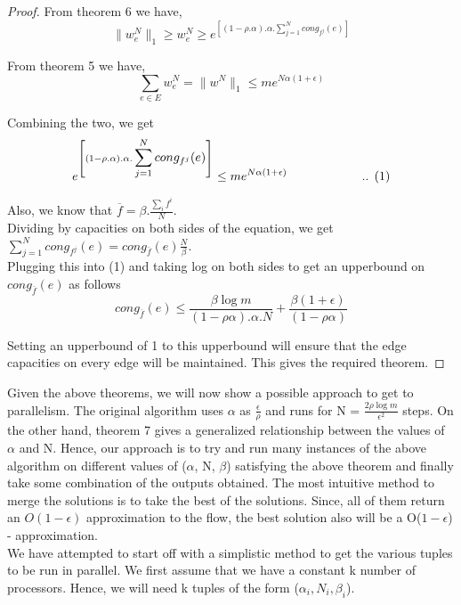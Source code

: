 \documentclass[BTech]{iitmdiss}
\begin{document}
	    \begin{proof}
	      From theorem 6 we have,
	      $$\|w_e^N\|_1 \geq w_e^N \geq e^{\left[ (1-\rho.\alpha). \alpha. \displaystyle\sum_{j=1}^N cong_{f^j}(e) \right]}$$
	      
	      From theorem 5 we have, 
	      $$\displaystyle\sum_{e \in E} w^N_e = \|w^N\|_1 \leq m e^{N\alpha(1+\epsilon)}$$
	      
	      Combining the two, we get 
	      $$e^{\left[ (1-\rho.\alpha). \alpha. \displaystyle\sum_{j=1}^N cong_{f^j}(e) \right]} \leq m e^{N\alpha(1+\epsilon)} \text{\hspace{20mm} .. (1)}$$
	      
	      Also, we know that $\overline{f} = \beta. \frac{\displaystyle\sum_{i}f^i }{N}$.\\
	      Dividing by capacities on both sides of the equation,
	      we get $\displaystyle\sum_{j=1}^N cong_{f^j}(e) = cong_{\overline{f}}(e) \frac{N}{\beta}$. \\
	      
	      Plugging this into (1) and taking log on both sides to get an upperbound on $cong_{\overline{f}}(e)$ as follows
	      $$cong_{\overline{f}}(e) \leq \frac{\beta \log m}{(1-\rho \alpha).\alpha.N} + \frac{\beta (1 + \epsilon)}{(1- \rho \alpha)}$$
	      
	      Setting an upperbound of 1 to this 
	      upperbound will ensure that the edge capacities on every edge will be maintained. This gives the required theorem.
	    \end{proof}
	    
	    Given the above theorems, we will now show a possible approach to get to parallelism. The original algorithm uses $\alpha$ as $\frac{\epsilon}{\rho}$
	    and runs for N = $\frac{2 \rho \log m}{\epsilon^2}$ steps. On the other hand, theorem 7 gives a generalized relationship between the values of 
	    $\alpha$ and N. Hence, our approach is to try and run many instances of the above algorithm on different values of ($\alpha$, N, $\beta$)
	    satisfying the above theorem and finally take some combination of the outputs obtained. The most intuitive method to merge the solutions
	    is to take the best of the solutions. Since, all of them return an $O(1-\epsilon)$ approximation to the flow, the best solution also will 
	    be a O($1-\epsilon$) - approximation. \\
	    
	    We have attempted to start off with a simplistic method to get the various tuples to be run in parallel. We first assume that we have a 
	    constant k number of processors. Hence, we will need k tuples of the form ($\alpha_i, N_i, \beta_i$). \\
	    
\end{document}
